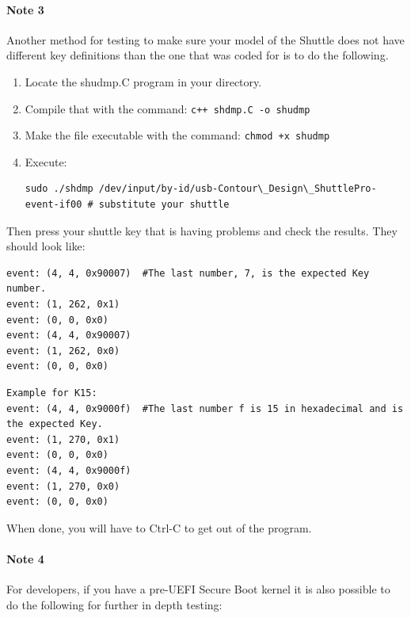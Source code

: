 \paragraph{Note 3} Another method for testing to make sure your
model of the Shuttle does not have different key definitions than
the one that \CGG{} was coded for is to do the following.

\begin{enumerate}
\item Locate the shudmp.C program in your \CGG{} directory.
\item Compile that with the command:  \texttt{c++ shdmp.C -o shudmp}
\item Make the file executable with the command:  \texttt{chmod +x shudmp}
\item Execute:
\begin{lstlisting}[style=sh]
sudo ./shdmp /dev/input/by-id/usb-Contour\_Design\_ShuttlePro-event-if00 # substitute your shuttle
\end{lstlisting}
\end{enumerate}

Then press your shuttle key that is having problems and check the
results.  They should look like:

\begin{lstlisting}[style=sh,caption={Example for K7}]
event: (4, 4, 0x90007)  #The last number, 7, is the expected Key number.
event: (1, 262, 0x1)
event: (0, 0, 0x0)
event: (4, 4, 0x90007)
event: (1, 262, 0x0)
event: (0, 0, 0x0)
\end{lstlisting}

\begin{lstlisting}[style=sh,caption={Example for K15}]
Example for K15:
event: (4, 4, 0x9000f)  #The last number f is 15 in hexadecimal and is the expected Key.
event: (1, 270, 0x1)
event: (0, 0, 0x0)
event: (4, 4, 0x9000f)
event: (1, 270, 0x0)
event: (0, 0, 0x0)
\end{lstlisting}

When done, you will have to Ctrl-C to get out of the program.

\paragraph{Note 4} For developers, if you have a pre-UEFI Secure
Boot kernel it is also possible to do the following for further in
depth testing:

